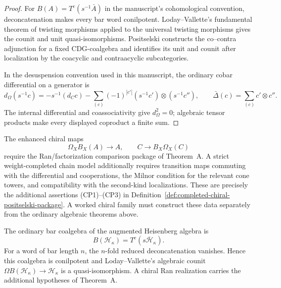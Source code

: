 \begin{proof}
For \(B(A)=T^c(s^{-1}\bar A)\) in the manuscript's cohomological
convention, deconcatenation makes every bar word
conilpotent.  Loday--Vallette's fundamental theorem of twisting
morphisms applied to the universal twisting morphisms gives the
counit and unit quasi-isomorphisms.  Positselski constructs the
co--contra adjunction for a fixed CDG-coalgebra and identifies its
unit and counit after localization by the coacyclic and
contraacyclic subcategories.

In the desuspension convention used in this manuscript, the ordinary
cobar differential on a generator is
\begin{equation}\label{eq:cobar-diff-generators}
 d_\Omega(s^{-1}c)
 =
 -s^{-1}(d_Cc)
 -\sum_{(c)}(-1)^{|c'|}
  (s^{-1}c')\otimes(s^{-1}c''),
 \qquad
 \bar\Delta(c)=\sum_{(c)}c'\otimes c'' .
\end{equation}
The internal differential and coassociativity give
\(d_\Omega^2=0\); algebraic tensor products make every displayed
coproduct a finite sum.
\end{proof}

\begin{remark}
\label{rem:conilpotency-chiral-completion}
The enhanced chiral maps
\[
 \Omega_XB_X(A)\longrightarrow A,
 \qquad
 C\longrightarrow B_X\Omega_X(C)
\]
require the Ran/factorization comparison package of Theorem~A.  A
strict weight-completed chain model additionally requires transition
maps commuting with the differential and cooperations, the Milnor
condition for the relevant cone towers, and compatibility with the
second-kind localizations.  These are precisely the additional
assertions \textup{(CP1)--(CP3)} in
Definition~\ref{def:completed-chiral-positselski-package}.  A worked
chiral family must construct these data separately from the ordinary
algebraic theorems above.
\end{remark}

\begin{example}
\label{ex:heisenberg-conilpotent-complete}
The ordinary bar coalgebra of the augmented Heisenberg algebra is
\[
 B(\mathcal H_\kappa)=T^c(s\overline{\mathcal H}_\kappa).
\]
For a word of bar length \(n\), the \(n\)-fold reduced
deconcatenation vanishes.  Hence this coalgebra is conilpotent and
Loday--Vallette's algebraic counit
\(\Omega B(\mathcal H_\kappa)\to\mathcal H_\kappa\) is a
quasi-isomorphism.  A chiral Ran realization carries the additional
hypotheses of Theorem~A.
\end{example}

